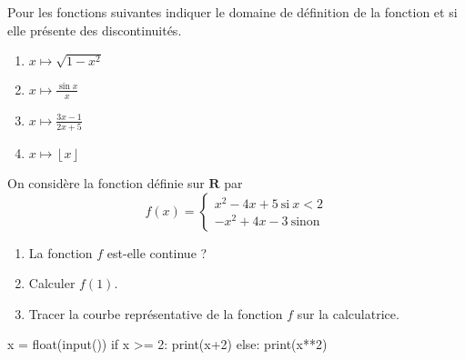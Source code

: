 \documentclass[12pt,a4paper,french]{article}
\newcommand{\R}{\mathbf{R}}
\theoremstyle{break}
\theoremstyle{plain}
\theoremstyle{nonumberplain}
\theoremstyle{nonumberbreak}
\begin{document}
\begin{question}[subtitle={Avec des expressions},
  topic={continuité}, class=3]
  Pour les fonctions suivantes indiquer le domaine de définition de la
  fonction et si elle présente des discontinuités.
  \begin{multicols}{4}
    \begin{enumerate}
      \item $x\mapsto \sqrt{1 - x^2}$
      \item $x\mapsto \frac{\sin x}x$
      \item $x\mapsto \frac{3x - 1}{2x + 5}$
      \item $x\mapsto \left\lfloor x \right\rfloor$
    \end{enumerate}
  \end{multicols}
\end{question}

\begin{question}[subtitle={Une fonction définie par morceaux},
  topic={continuité},class=2]
  On considère la fonction définie sur $\R$ par \[ f(x) = \left\lbrace
  \begin{matrix}  x^2 - 4x + 5\ \text{si}\ x<2 \\
  -x^2 + 4x -3 \ \text{sinon} \end{matrix} \right. \]
  \begin{enumerate}
    \item La fonction $f$ est-elle continue ?
    \item Calculer $f(1)$.
    \item Tracer la courbe représentative de la fonction $f$ sur la
      calculatrice.
  \end{enumerate}
\end{question}

\begin{lstquestion}[pre={On considère le code Python suivant},
  post={%
    \begin{enumerate}%
      \item Que renvoie ce code pour 1 ; 2 ; 1,99 ; 2,01 ?
      \item Transformer ce code en une fonction Python.
      \item Écrire une fonction définie de la même façon que dans
        l'exercice précédent.
      \item La fonction ainsi définie est-elle continue ?
    \end{enumerate}%
  },
  options={
    subtitle={Algorihtme},
    class=3,topic={continuité},
  },
  listings={language=Python}]
  x = float(input())
  if x >= 2:
      print(x+2)
  else:
      print(x**2)
\end{lstquestion}
\end{document}
